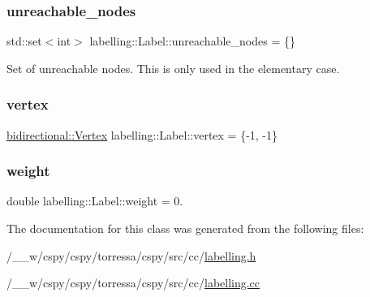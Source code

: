 \mbox{\label{classlabelling_1_1Label_ae684804e463fe690b4fe6ee32812e123}} 
\subsubsection{\texorpdfstring{unreachable\+\_\+nodes}{unreachable\_nodes}}
{\footnotesize\ttfamily std\+::set$<$int$>$ labelling\+::\+Label\+::unreachable\+\_\+nodes = \{\}}



Set of unreachable nodes. This is only used in the elementary case. 

\mbox{\label{classlabelling_1_1Label_a7c8972ee9d1c00fd348025c321467f75}} 
\subsubsection{\texorpdfstring{vertex}{vertex}}
{\footnotesize\ttfamily \hyperlink{structbidirectional_1_1Vertex}{bidirectional\+::\+Vertex} labelling\+::\+Label\+::vertex = \{-\/1, -\/1\}}

\mbox{\label{classlabelling_1_1Label_a478f34a67528586877720483c5f0d38b}} 
\subsubsection{\texorpdfstring{weight}{weight}}
{\footnotesize\ttfamily double labelling\+::\+Label\+::weight = 0.}



The documentation for this class was generated from the following files\+:\begin{DoxyCompactItemize}
\item 
/\+\_\+\+\_\+w/cspy/cspy/torressa/cspy/src/cc/\hyperlink{labelling_8h}{labelling.\+h}\item 
/\+\_\+\+\_\+w/cspy/cspy/torressa/cspy/src/cc/\hyperlink{labelling_8cc}{labelling.\+cc}\end{DoxyCompactItemize}
